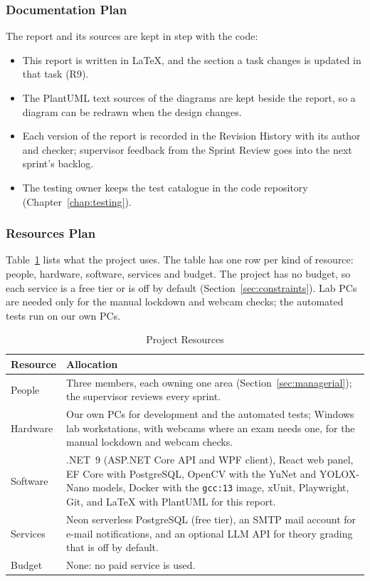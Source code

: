 \subsubsection{Documentation Plan}

The report and its sources are kept in step with the code:
\begin{itemize}[nosep]
    \item This report is written in LaTeX, and the section a task changes is updated in that task (R9).
    \item The PlantUML text sources of the diagrams are kept beside the report, so a diagram can be redrawn when the design changes.
    \item Each version of the report is recorded in the Revision History with its author and checker; supervisor feedback from the Sprint Review goes into the next sprint's backlog.
    \item The testing owner keeps the test catalogue in the code repository (Chapter~\ref{chap:testing}).
\end{itemize}

\subsubsection{Resources Plan}
\label{sec:resources_plan}

Table~\ref{tab:resources} lists what the project uses. The table has one row per kind of resource: people, hardware, software, services and budget. The project has no budget, so each service is a free tier or is off by default (Section~\ref{sec:constraints}). Lab PCs are needed only for the manual lockdown and webcam checks; the automated tests run on our own PCs.

\begin{table}[!ht]
\centering
\caption{Project Resources}
\label{tab:resources}
{\small\renewcommand{\arraystretch}{1.2}
\begin{tabularx}{\textwidth}{>{\raggedright\arraybackslash}p{2.2cm}>{\raggedright\arraybackslash}X}
\hline\hline
\textbf{Resource} & \textbf{Allocation} \\
\hline
People & Three members, each owning one area (Section~\ref{sec:managerial}); the supervisor reviews every sprint. \\
Hardware & Our own PCs for development and the automated tests; Windows lab workstations, with webcams where an exam needs one, for the manual lockdown and webcam checks. \\
Software & .NET~9 (ASP.NET Core API and WPF client), React web panel, EF Core with PostgreSQL, OpenCV with the YuNet and YOLOX-Nano models, Docker with the \texttt{gcc:13} image, xUnit, Playwright, Git, and LaTeX with PlantUML for this report. \\
Services & Neon serverless PostgreSQL (free tier), an SMTP mail account for e-mail notifications, and an optional LLM API for theory grading that is off by default. \\
Budget & None: no paid service is used. \\
\hline\hline
\end{tabularx}}
\end{table}

